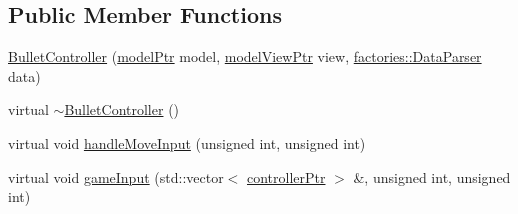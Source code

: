 \subsection*{\-Public \-Member \-Functions}
\begin{DoxyCompactItemize}
\item 
\hyperlink{classcontrollers_1_1BulletController_ab1b856cc384015ac6269821719029cff}{\-Bullet\-Controller} (\hyperlink{ModelView_8h_a78966ddb517fca8d2b29a2bc5c31e74e}{model\-Ptr} model, \hyperlink{Controller_8h_a8ca0a41a38eb52be242997413482c0cf}{model\-View\-Ptr} view, \hyperlink{classfactories_1_1DataParser}{factories\-::\-Data\-Parser} data)
\item 
virtual \hyperlink{classcontrollers_1_1BulletController_a3702d0bbc8c3abfa335cf2d0ec9e42a8}{$\sim$\-Bullet\-Controller} ()
\item 
virtual void \hyperlink{classcontrollers_1_1BulletController_a0a7ff984d1b2e99685ba30f6c5c7f3c0}{handle\-Move\-Input} (unsigned int, unsigned int)
\item 
virtual void \hyperlink{classcontrollers_1_1BulletController_a376f6bef112f4d6afde4569ccf6f7cc1}{game\-Input} (std\-::vector$<$ \hyperlink{namespacecontrollers_ab74cf2ed38c0b0460698b4eb6fe8bec5}{controller\-Ptr} $>$ \&, unsigned int, unsigned int)
\end{DoxyCompactItemize}



